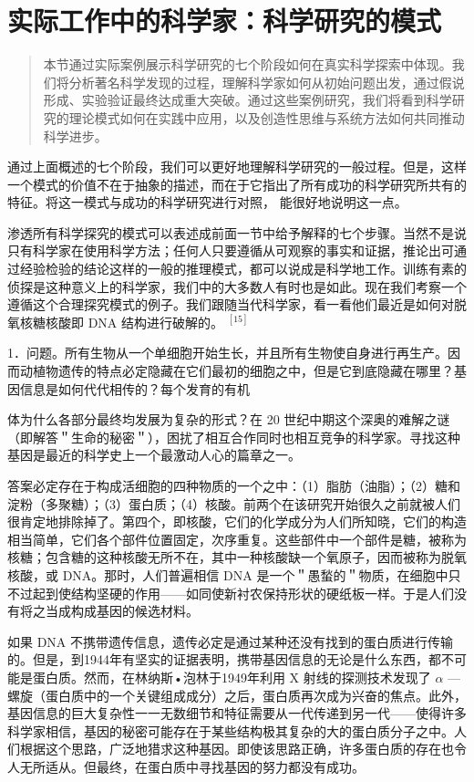\section{实际工作中的科学家：科学研究的模式}

\begin{quotation}
本节通过实际案例展示科学研究的七个阶段如何在真实科学探索中体现。我们将分析著名科学发现的过程，理解科学家如何从初始问题出发，通过假说形成、实验验证最终达成重大突破。通过这些案例研究，我们将看到科学研究的理论模式如何在实践中应用，以及创造性思维与系统方法如何共同推动科学进步。
\end{quotation}

通过上面概述的七个阶段，我们可以更好地理解科学研究的一般过程。但是，这样一个模式的价值不在于抽象的描述，而在于它指出了所有成功的科学研究所共有的特征。将这一模式与成功的科学研究进行对照， 能很好地说明这一点。

渗透所有科学探究的模式可以表述成前面一节中给予解释的七个步骤。当然不是说只有科学家在使用科学方法；任何人只要遵循从可观察的事实和证据，推论出可通过经验检验的结论这样的一般的推理模式，都可以说成是科学地工作。训练有素的侦探是这种意义上的科学家，我们中的大多数人有时也是如此。现在我们考察一个遵循这个合理探究模式的例子。我们跟随当代科学家，看一看他们最近是如何对脱氧核糖核酸即 DNA 结构进行破解的。 ${ }^{[15]}$

1．问题。所有生物从一个单细胞开始生长，并且所有生物使自身进行再生产。因而动植物遗传的特点必定隐藏在它们最初的细胞之中，但是它到底隐藏在哪里？基因信息是如何代代相传的？每个发育的有机

体为什么各部分最终均发展为复杂的形式？在 20 世纪中期这个深奥的难解之谜（即解答＂生命的秘密＂），困扰了相互合作同时也相互竞争的科学家。寻找这种基因是最近的科学史上一个最激动人心的篇章之一。

答案必定存在于构成活细胞的四种物质的一个之中：（1）脂肪（油脂）；（2）糖和淀粉（多聚糖）；（3）蛋白质；（4）核酸。前两个在该研究开始很久之前就被人们很肯定地排除掉了。第四个，即核酸，它们的化学成分为人们所知晓，它们的构造相当简单，它们各个部件位置固定，次序重复。这些部件中一个部件是糖，被称为核糖；包含糖的这种核酸无所不在，其中一种核酸缺一个氧原子，因而被称为脱氧核酸，或 DNA。那时，人们普遍相信 DNA 是一个＂愚蝵的＂物质，在细胞中只不过起到使结构坚硬的作用——如同使新衬农保持形状的硬纸板一样。于是人们没有将之当成构成基因的候选材料。

如果 DNA 不携带遗传信息，遗传必定是通过某种还没有找到的蛋白质进行传输的。但是，到1944年有坚实的证据表明，携带基因信息的无论是什么东西，都不可能是蛋白质。然而，在林纳斯•泡林于1949年利用 X 射线的探测技术发现了 $\alpha$ —螺旋（蛋白质中的一个关键组成成分）之后，蛋白质再次成为兴奋的焦点。此外，基因信息的巨大复杂性一一无数细节和特征需要从一代传递到另一代——使得许多科学家相信，基因的秘密可能存在于某些结构极其复杂的大的蛋白质分子之中。人们根据这个思路，广泛地猎求这种基因。即使该思路正确，许多蛋白质的存在也令人无所适从。但最终，在蛋白质中寻找基因的努力都没有成功。


